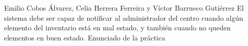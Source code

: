 {Emilio Cobos Álvarez, Celia Herrera Ferreira y Víctor Barrueco Gutiérrez}
{El sistema debe ser capaz de notificar al administrador del centro cuando algún elemento del inventario está en mal estado, y también cuando no queden elementos en buen estado.}
{}
{Enunciado de la práctica}


